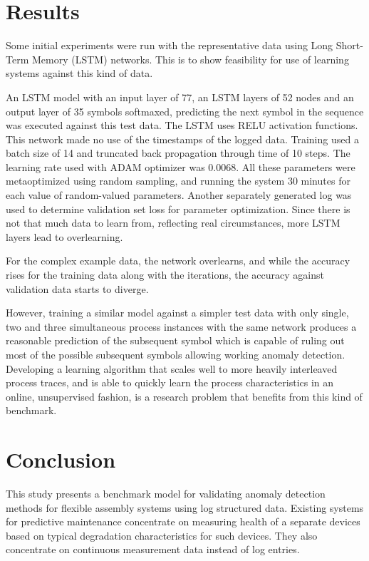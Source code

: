\documentclass[journal]{IEEEtran}
\begin{document}
\section{Results}

Some initial experiments were run with the representative data using Long Short-Term Memory (LSTM) networks. This is to show feasibility for use of learning systems
against this kind of data.

An LSTM model with an input layer of 77, an LSTM layers of 52 nodes and an output layer of 35 symbols softmaxed,
predicting the next symbol in the sequence was executed against this test data. The LSTM uses RELU activation functions. This network made no use of the timestamps
of the logged data.
Training used a batch size of 14 and truncated back propagation through time of 10 steps. The learning rate used with ADAM optimizer was 0.0068. All these parameters
were metaoptimized using random sampling, and running the system 30 minutes for each value of random-valued parameters. Another separately generated log was used
to determine validation set loss for parameter optimization. Since there is not that much data to learn from, reflecting real circumstances, more LSTM layers lead to overlearning.

For the complex example data, the network overlearns, and while the accuracy rises for the training data along with the iterations, the accuracy against validation data starts
to diverge.

However, training a similar model against a simpler test data with only single, two and three simultaneous process instances with the same network produces a reasonable
prediction of the subsequent symbol which is capable of ruling out most of the possible subsequent symbols allowing working anomaly detection.
Developing a learning algorithm that scales well to more heavily interleaved process traces, and is able to quickly learn the process characteristics in an online,
unsupervised fashion, is a research problem that benefits from this kind of benchmark.

\section{Conclusion}

This study presents a benchmark model for validating anomaly detection methods for flexible assembly systems using log structured data.
Existing systems for predictive maintenance concentrate on measuring health of a separate devices based on typical degradation characteristics
for such devices. They also concentrate on continuous measurement data instead of log entries.
\end{document}
